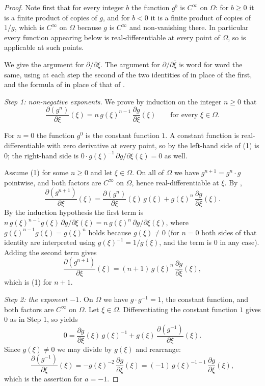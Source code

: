\begin{proof}
Note first that for every integer $b$ the function $g^{b}$ is $C^\infty$ on
$\Omega$: for $b\ge0$ it is a finite product of copies of $g$, and for $b<0$ it
is a finite product of copies of $1/g$, which is $C^\infty$ on $\Omega$ because
$g$ is $C^\infty$ and non-vanishing there.  In particular every function
appearing below is real-differentiable at every point of $\Omega$, so
 is applicable at such points.

We give the argument for $\partial/\partial\xi$.  The argument for
$\partial/\partial\bar\xi$ is word for word the same, using at each step the
second of the two identities of  in place of the
first, and the formula of  in place of that of .

\emph{Step 1: non-negative exponents.}  We prove by induction on the integer
$n\ge0$ that
\begin{equation}\tag{1}
  \frac{\partial(g^{n})}{\partial\xi}(\xi)=n\,g(\xi)^{n-1}\,\frac{\partial g}{\partial\xi}(\xi)
  \qquad\text{for every }\xi\in\Omega .
\end{equation}

For $n=0$ the function $g^{0}$ is the constant function $1$.  A constant
function is real-differentiable with zero derivative at every point, so by
 the left-hand side of (1) is $0$; the right-hand side is
$0\cdot g(\xi)^{-1}\,\partial g/\partial\xi(\xi)=0$ as well.

Assume (1) for some $n\ge0$ and let $\xi\in\Omega$.  On all of $\Omega$ we have
$g^{n+1}=g^{n}\cdot g$ pointwise, and both factors are $C^\infty$ on $\Omega$,
hence real-differentiable at $\xi$.  By ,
\[
  \frac{\partial(g^{n+1})}{\partial\xi}(\xi)
  =\frac{\partial(g^{n})}{\partial\xi}(\xi)\,g(\xi)
   +g(\xi)^{n}\,\frac{\partial g}{\partial\xi}(\xi).
\]
By the induction hypothesis the first term is
$n\,g(\xi)^{n-1}g(\xi)\,\partial g/\partial\xi(\xi)
 =n\,g(\xi)^{n}\,\partial g/\partial\xi(\xi)$, where
$g(\xi)^{n-1}g(\xi)=g(\xi)^{n}$ holds because $g(\xi)\neq0$ (for $n=0$ both
sides of that identity are interpreted using $g(\xi)^{-1}=1/g(\xi)$, and the
term is $0$ in any case).  Adding the second term gives
\[
  \frac{\partial(g^{n+1})}{\partial\xi}(\xi)
  =(n+1)\,g(\xi)^{n}\,\frac{\partial g}{\partial\xi}(\xi),
\]
which is (1) for $n+1$.

\emph{Step 2: the exponent $-1$.}  On $\Omega$ we have $g\cdot g^{-1}=1$, the
constant function, and both factors are $C^\infty$ on $\Omega$.  Let
$\xi\in\Omega$.  Differentiating the constant function $1$ gives $0$ as in
Step 1, so  yields
\[
  0=\frac{\partial g}{\partial\xi}(\xi)\,g(\xi)^{-1}
    +g(\xi)\,\frac{\partial (g^{-1})}{\partial\xi}(\xi).
\]
Since $g(\xi)\neq0$ we may divide by $g(\xi)$ and rearrange:
\begin{equation}\tag{2}
  \frac{\partial (g^{-1})}{\partial\xi}(\xi)
  =-g(\xi)^{-2}\,\frac{\partial g}{\partial\xi}(\xi)
  =(-1)\,g(\xi)^{-1-1}\,\frac{\partial g}{\partial\xi}(\xi),
\end{equation}
which is the assertion for $a=-1$.


\end{proof}
